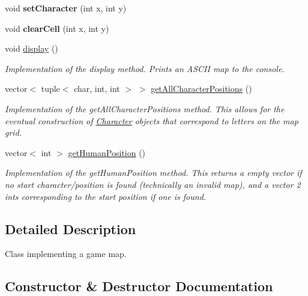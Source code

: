 \begin{DoxyCompactItemize}
\hypertarget{classMap_ae55508704e1118b5a93195b329e9c36a}{}\label{classMap_ae55508704e1118b5a93195b329e9c36a} 
void {\bfseries set\+Character} (int x, int y)
\item 
\hypertarget{classMap_acfb984ad6e0e10cbddc9aa24ee0fc749}{}\label{classMap_acfb984ad6e0e10cbddc9aa24ee0fc749} 
void {\bfseries clear\+Cell} (int x, int y)
\item 
\hypertarget{classMap_ad5fa4af56ebdcfdbfe999ae4ba971135}{}\label{classMap_ad5fa4af56ebdcfdbfe999ae4ba971135} 
void \hyperlink{classMap_ad5fa4af56ebdcfdbfe999ae4ba971135}{display} ()
\begin{DoxyCompactList}\small\item\em Implementation of the display method. Prints an A\+S\+C\+II map to the console. \end{DoxyCompactList}\item 
\hypertarget{classMap_aeb83928090860eb04aa55d0584aaabf3}{}\label{classMap_aeb83928090860eb04aa55d0584aaabf3} 
vector$<$ tuple$<$ char, int, int $>$ $>$ \hyperlink{classMap_aeb83928090860eb04aa55d0584aaabf3}{get\+All\+Character\+Positions} ()
\begin{DoxyCompactList}\small\item\em Implementation of the get\+All\+Character\+Positions method. This allows for the eventual construction of \hyperlink{classCharacter}{Character} objects that correspond to letters on the map grid. \end{DoxyCompactList}\item 
\hypertarget{classMap_a971ac7686d5ac9e6d65b9b80599aec47}{}\label{classMap_a971ac7686d5ac9e6d65b9b80599aec47} 
vector$<$ int $>$ \hyperlink{classMap_a971ac7686d5ac9e6d65b9b80599aec47}{get\+Human\+Position} ()
\begin{DoxyCompactList}\small\item\em Implementation of the get\+Human\+Position method. This returns a empty vector if no start character/position is found (technically an invalid map), and a vector 2 ints corresponding to the start position if one is found. \end{DoxyCompactList}\end{DoxyCompactItemize}


\subsection{Detailed Description}
Class implementing a game map. 

\subsection{Constructor \& Destructor Documentation}
\hypertarget{classMap_a6c356d09b5b7c946b5a3cf23dbabe0b2}{}\label{classMap_a6c356d09b5b7c946b5a3cf23dbabe0b2} 
